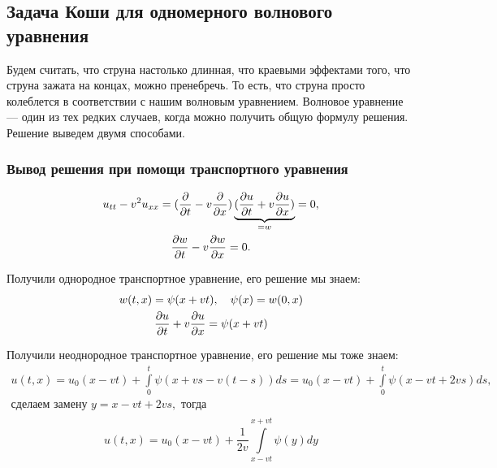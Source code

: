 
\subsection{Задача Коши для одномерного волнового уравнения}
Будем считать, что струна настолько длинная, что краевыми эффектами того, что струна зажата на концах, можно пренебречь. То есть, что струна просто колеблется в соответствии с нашим волновым уравнением. Волновое уравнение --- один из тех редких случаев, когда можно получить общую формулу решения.
Решение выведем двумя способами.
\subsubsection{Вывод решения при помощи транспортного уравнения}
\begin{gather*}
	u_{tt} - v^2 u_{xx} = (\pder{t} - v \pder{x}) \underbrace {(\pder[u]{t} + v \pder[u]{x})}_{= w} = 0, \\
 	\pder[w]{t} - v \pder[w]{x} = 0.
\end{gather*}

Получили однородное транспортное уравнение, его решение мы знаем:
\begin{gather*}
	w(t,x) = \psi (x + vt),\quad \psi (x) = w(0,x) \\
	\pder[u]{t} + v \pder[u]{x} = \psi (x + vt)		
\end{gather*}

Получили неоднородное транспортное уравнение, его решение мы тоже знаем:
\begin{gather*}
	u(t,x) = u_0 (x - vt) + \int \limits_0^t \psi(x + vs - v(t-s)) ds = u_0 (x - vt) + \int \limits_0^t \psi (x - vt + 2vs) ds, \\
	\text{сделаем замену }y = x - vt + 2vs, \text{ тогда} \\
\end{gather*}
\begin{equation}
    u(t,x) = u_0 (x - vt) + \frac {1} {2v} \int \limits_{x-vt}^{x+vt} \psi (y) dy
\label{wavehomans}
\end{equation}

